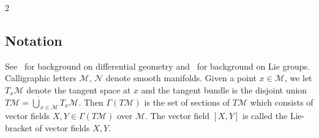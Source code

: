 \documentclass{article}
\newcommand{\M}{\mathcal{M}}                                %
\newcommand{\state}{x}
\begin{document}
\begin{multicols}{2}





\subsection{Notation}
See~\cite{Lee2012} for background on differential geometry and~\cite{Holm2009} for background on Lie groups.
Calligraphic letters $\M,\,\mathcal{N}$ denote smooth manifolds. Given a point $\state \in \M$, we let $T_\state\M$ denote the tangent space at $\state$ and the tangent bundle is the disjoint union $T\M = \dot{\bigcup}_{\state\in\M} T_\state \M$. Then $\Gamma(T\M)$ is the set of sections of $T\M$ which consists of vector fields $X,Y \in \Gamma(T\M)$ over $\M$. The vector field $[X,Y]$ is called the Lie-bracket of vector fields $X,Y$.


\end{multicols}
\end{document}
